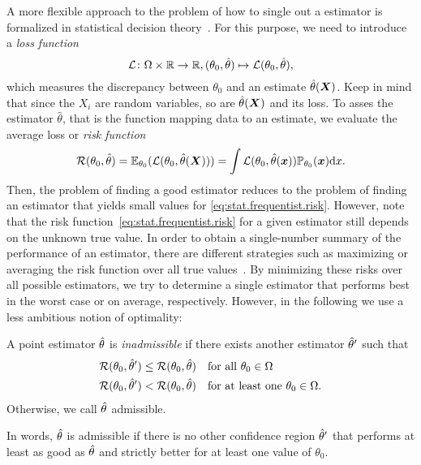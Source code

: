 A more flexible approach to the problem of how to single out a  estimator is formalized in statistical decision theory~\cite{Casella_2008_Statistical,Lehmann_1998_Theory}.
For this purpose, we need to introduce a \emph{loss function}
\[
  \label{eq:stat.frequentist.loss_function}
  \mathcal{L}\colon \Omega \times \mathbb{R} \to \mathbb{R},  (\theta_0, \hat{\theta}) \mapsto \mathcal{L}(\theta_0, \hat{\theta}),
\]
which measures the discrepancy between $\theta_0$ and an estimate $\hat{\theta}({\boldsymbol{X}})$.
Keep in mind that since the $X_i$ are random variables, so are $\hat{\theta}({\boldsymbol{X}})$ and its loss.
To asses the estimator $\hat\theta$, that is the function mapping data to an estimate, we evaluate the average loss or \emph{risk function}
\[
  \label{eq:stat.frequentist.risk}
  \mathcal{R}(\theta_0, \hat\theta) = \mathbb{E}_{\theta_0}(\mathcal{L}(\theta_0, \hat\theta({\boldsymbol{X}})))
  = \int \mathcal{L}(\theta_0, \hat\theta({\boldsymbol{x}})) \mathbb{P}_{\theta_0}({\boldsymbol{x}}) \mathrm{d} x.
\]
Then, the problem of finding a good estimator reduces to the problem of finding an estimator that yields small values for \cref{eq:stat.frequentist.risk}.
However, note that the risk function~\eqref{eq:stat.frequentist.risk} for a given estimator still depends on the unknown true value.
In order to obtain a single-number summary of the performance of an estimator, there are different strategies such as maximizing or averaging the risk function over all true values~\cite[Sec.\ 12.2]{Wasserman_2013_All}.
By minimizing these risks over all possible estimators, we try to determine a single estimator that performs best in the worst case or on average, respectively.
However, in the following we use a less ambitious notion of optimality:
\begin{definition}{\cite[Def. 12.17]{Wasserman_2013_All}}
  \label{def:stat.frequentist.admissability_point_estimators}
  A point estimator $\hat{\theta}$ is \emph{inadmissible} if there exists another estimator $\hat{\theta}'$ such that
  \begin{align*}
    \mathcal{R}(\theta_0, \hat{\theta}') \le \mathcal{R}(\theta_0, \hat{\theta}) &\quad\mbox{for all } \theta_0 \in \Omega \\
    \mathcal{R}(\theta_0, \hat{\theta}') <   \mathcal{R}(\theta_0, \hat{\theta}) &\quad\mbox{for at least one } \theta_0 \in \Omega.
  \end{align*}
  Otherwise, we call $\hat{\theta}$ admissible.
\end{definition}
In words, $\hat{\theta}$ is admissible if there is no other confidence region $\hat{\theta}'$ that performs at least as good as $\hat{\theta}$ and strictly better for at least one value of $\theta_0$.

